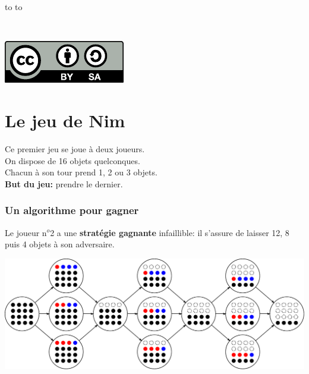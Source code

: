 \documentclass[a7paper,pagesize,DIV=14,10pt]{scrbook}
\begin{document}
\begin{minipage}{.8\linewidth}
  \begin{spacing}{.5}
    \hbox to \linewidth{\tiny~\hfill Vous pouvez copier, modifier et diffuser librement ce document,}
    \hbox to \linewidth{\tiny~\hfill à la seule condition de laisser ces mêmes droits à vos lecteurs.}
  \end{spacing}
\end{minipage}%
~
\begin{minipage}[b]{.16\linewidth}
  \includegraphics[width=\linewidth]{img/logo_by-sa.pdf}
\end{minipage}%


\section*{Le jeu de Nim}

\vspace{-.5\baselineskip}
Ce premier jeu se joue à deux joueurs.\\
On dispose de 16 objets quelconques.\\
Chacun à son tour prend 1, 2 ou 3 objets.\\
\textbf{But du jeu:} prendre le dernier.

\vspace{-.5\baselineskip}
\subsubsection*{Un algorithme pour gagner}

\vspace{-.5\baselineskip} %
Le joueur n$^o$2 a une \textbf{stratégie gagnante} infaillible: il
s'assure de laisser 12, 8 puis 4 objets à son adversaire.

\includegraphics[width=\linewidth]{img/nim16.pdf}
\end{document}
